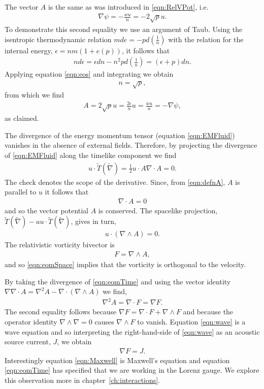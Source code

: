 \documentclass[10pt, fleqn,draft,showtrims,oldfontcommands]{article} %
\newcommand{\eqa}[1]{\begin{align}#1\end{align}}
\newcommand{\eqal}[2]{\begin{align}#1\label{eqn:#2}\end{align}}
\newcommand{\eqnref}[1]{\ref{eqn:#1}}
\newcommand{\lr}[1]{\left( #1 \right)}
\newcommand{\del}{\nabla}
\newcommand{\scope}[1]{\tilde{#1}}
\newcommand{\half}{\tfrac{1}{2}}
\newcommand{\chapref}[1]{chapter~\ref{ch:#1}}
\begin{document}
The vector $A$ is the same as was introduced in \eqnref{RelVPot},
i.e.
\begin{align}
  \del \psi = - \frac{wu}{n} = - 2\sqrt p u.
\end{align}
To demonstrate this second equality we  use an argument of Taub\cite{Taub1978}.
Using the isentropic thermodynamic relation $m de = - p d\lr{\frac{1}{n}}$ with the relation for the internal energy, $\epsilon= nm( 1 + e(p))$,
it follows that 
\begin{align}
 n d\epsilon = \epsilon dn - n^2 p d \lr{\frac{1}{n}} = \lr{\epsilon + p} dn.
\end{align}
Applying equation \eqnref{eos} and integrating we obtain
\begin{align}
  n = \sqrt p, \label{eqn:nrootp}
\end{align}
from which we find
\begin{align}
A = 2\sqrt p  u = \frac{2\epsilon}{n} u = \frac{wu}{n} =  - \del \psi,
\end{align}
as claimed.


The divergence of the energy momentum tensor (equation \eqnref{EMFluid}) vanishes in the absence of external fields.
Therefore, by projecting the divergence of \eqnref{EMFluid} along the timelike component we find
\eqa{
  u\cdot\scope T(\scope\del)= \half  u\cdot A \del \cdot A = 0.
}
The check denotes the scope of the derivative.
Since, from \eqnref{defnA}, $A$ is parallel to $u$  it follows that 
\eqal{
  \del \cdot A  =0
}{eomTime}
and so the vector potential $A$ is conserved.
The spacelike projection, $\scope T(\scope \del) - u u\cdot \scope T(\scope\del)$, gives in turn,
\eqal{
  u \cdot \lr{\del \wedge A} = 0.
}{eomSpace}
The relativistic vorticity bivector is 
\eqal{F = \del \wedge A,}{DefnVorticity}
and so \eqnref{eomSpace} implies that the vorticity is orthogonal to the velocity.

By taking the divergence of \eqnref{eomTime} and using the vector identity
$\del \del \cdot A = \del^2 A - \del\cdot\lr{ \del \wedge A} $
 we find,
\eqal{
  \del^2 A = \del \cdot F = \del F.
}{wave}
The second equality follows because $\del F = \del \cdot F + \del \wedge F$ 
and because the  operator identity $\del\wedge \del = 0$ causes $\del \wedge F$ to vanish.
Equation \eqnref{wave} is a wave equation and so interpreting the right-hand-side of \eqnref{wave} as an acoustic source current, $J$, we obtain
\eqal{
  \del  F = J.
}{Maxwell}
Interestingly equation \eqnref{Maxwell} is Maxwell's equation and equation \eqnref{eomTime} has specified that we are working in the Lorenz gauge.
We explore this observation more in \chapref{interactions}.
\end{document}
